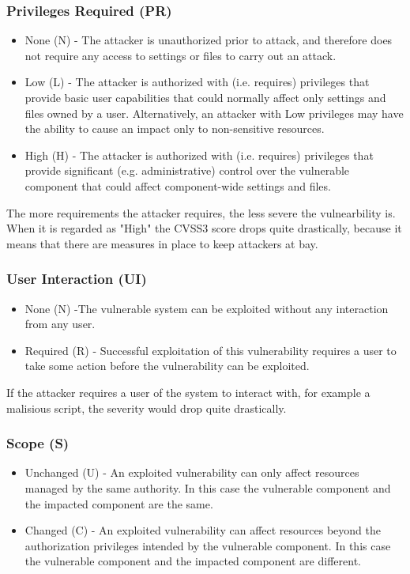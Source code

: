 \subsubsection{Privileges Required (PR)}

\begin{itemize}
	\item None (N) - The attacker is unauthorized prior to attack, and therefore does not require any access to settings or files to carry out an attack.
	\item Low (L) - The attacker is authorized with (i.e. requires) privileges that provide basic user capabilities that could normally affect only settings and files owned by a user. Alternatively, an attacker with Low privileges may have the ability to cause an impact only to non-sensitive resources.
	\item High (H) - The attacker is authorized with (i.e. requires) privileges that provide significant (e.g. administrative) control over the vulnerable component that could affect component-wide settings and files.
\end{itemize}

The more requirements the attacker requires, the less severe the vulnearbility is. When it is regarded as "High" the CVSS3 score drops quite drastically, because it means that there are measures in place to keep attackers at bay.

\subsubsection{User Interaction (UI)}

\begin{itemize}
	\item None (N) -The vulnerable system can be exploited without any interaction from any user.
	\item Required (R) - Successful exploitation of this vulnerability requires a user to take some action before the vulnerability can be exploited. 
\end{itemize}

If the attacker requires a user of the system to interact with, for example a malisious script, the severity would drop quite drastically.

\subsubsection{Scope (S)}

\begin{itemize}
	\item Unchanged (U) - An exploited vulnerability can only affect resources managed by the same authority. In this case the vulnerable component and the impacted component are the same.
	\item Changed (C) - An exploited vulnerability can affect resources beyond the authorization privileges intended by the vulnerable component. In this case the vulnerable component and the impacted component are different. 
\end{itemize}

